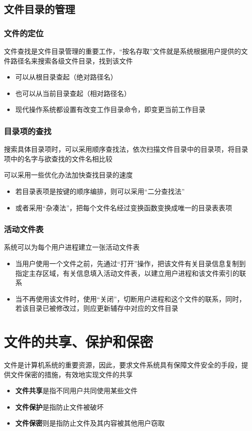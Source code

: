 \documentclass[cs4size,a4paper,10pt]{ctexart}
\begin{document}
	\subsection{文件目录的管理}

	\subsubsection{文件的定位}
	文件查找是文件目录管理的重要工作，“按名存取”文件就是系统根据用户提供的文件路径名来搜索各级文件目录，找到该文件
	\begin{itemize}
		\item 可以从根目录查起（绝对路径名）
		\item 也可以从当前目录查起（相对路径名）
		\item 现代操作系统都设置有改变工作目录命令，即变更当前工作目录
	\end{itemize}

	\subsubsection{目录项的查找}
	搜索具体目录项时，可以采用顺序查找法，依次扫描文件目录中的目录项，将目录项中的名字与欲查找的文件名相比较

	可以采用一些优化办法加快查找目录的速度
	\begin{itemize}
		\item 若目录表项是按键的顺序编排，则可以采用“二分查找法”
		\item 或者采用“杂凑法”，把每个文件名经过变换函数变换成唯一的目录表表项
	\end{itemize}

	\subsubsection{活动文件表}
	系统可以为每个用户进程建立一张活动文件表
	\begin{itemize}
		\item 当用户使用一个文件之前，先通过“打开”操作，把该文件有关目录信息复制到指定主存区域，有关信息填入活动文件表，以建立用户进程和该文件索引的联系
		\item 当不再使用该文件时，使用“关闭”，切断用户进程和这个文件的联系，同时，若该目录已被修改过，则应更新辅存中对应的文件目录
	\end{itemize}

	\section{文件的共享、保护和保密}
	文件是计算机系统的重要资源，因此，要求文件系统具有保障文件安全的手段，提供文件保密的措施，有效地实现文件的共享
	\begin{itemize}
		\item \textbf{文件共享}是指不同用户共同使用某些文件
		\item \textbf{文件保护}是指防止文件被破坏
		\item \textbf{文件保密}则是指防止文件及其内容被其他用户窃取
	\end{itemize}
\end{document}
